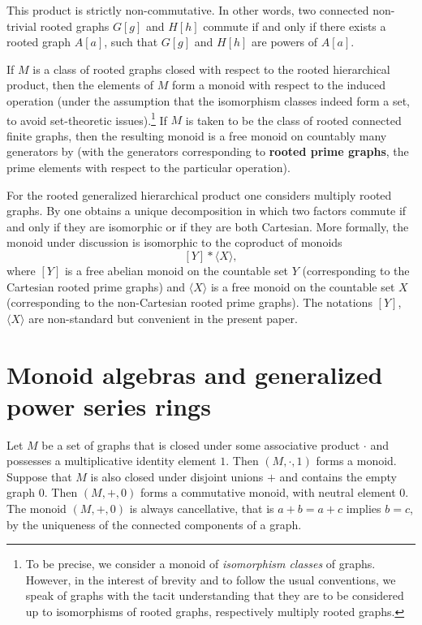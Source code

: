 \documentclass{amsart}
\theoremstyle{plain}
\theoremstyle{definition}
\newcommand{\defit}[1]{\textbf{#1}}
\begin{document}
This product is strictly non-commutative. In other words, two connected non-trivial rooted graphs $G[g]$ and $H[h]$ commute if and only if there exists a  rooted graph $A[a]$, such that $G[g]$ and $H[h]$ are powers of $A[a]$.

If $M$ is a class of rooted graphs closed with respect to the rooted hierarchical product, then the elements of $M$ form a monoid with respect to the induced operation (under the assumption that the isomorphism classes indeed form a set, to avoid set-theoretic issues).\footnote{To be precise, we consider a monoid of \emph{isomorphism classes} of graphs. However, in the interest of brevity and to follow the usual conventions, we speak of graphs with the tacit understanding that they are to be considered up to isomorphisms of rooted graphs, respectively multiply rooted graphs.}
If $M$ is taken to be the class of rooted connected finite graphs, then the resulting monoid is a free monoid on countably many generators by  \cite[Corollary 2.6]{imrich-kalinowski-pilsniak23}  (with the generators corresponding to \defit{rooted prime graphs}, the prime elements with respect to the particular operation).

For the rooted generalized hierarchical product one considers multiply rooted graphs.
By \cite[Theorem 4.2]{imrich-kalinowski-pilsniak23}
one obtains a unique decomposition in which two factors commute if and only if they are isomorphic or if they are both Cartesian.
More formally, the monoid under discussion is isomorphic to the coproduct of monoids
\[
  [Y] * \langle X \rangle,
\]
where $[Y]$ is a free abelian monoid on the countable set $Y$ (corresponding to the Cartesian rooted prime graphs) and $\langle X \rangle$ is a free monoid on the countable set $X$ (corresponding to the non-Cartesian rooted prime graphs).
The notations $[Y]$, $\langle X \rangle$ are non-standard but convenient in the present paper.

\section{Monoid algebras and generalized power series rings}\label{sec:monoidalgebras}

Let $M$ be a set of graphs that is closed under some associative product $\cdot$ and possesses a multiplicative identity element $1$.
Then $(M,\cdot, 1)$ forms a monoid.
Suppose that $M$ is also closed under disjoint unions $+$ and contains the empty graph $0$.
Then $(M, +, 0)$ forms a commutative monoid, with neutral element 0.
The monoid $(M, +, 0)$ is always cancellative, that is $a + b = a + c$ implies $b=c$, by the uniqueness of the connected components of a graph.
\end{document}
